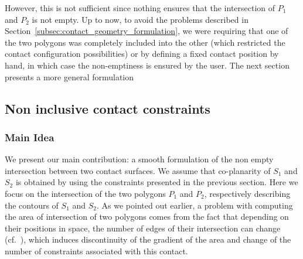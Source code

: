 However, this is not sufficient since nothing ensures that the intersection of $P_1$ and $P_2$ is not empty.
Up to now, to avoid the problems described in Section~\ref{subsec:contact_geometry_formulation}, we were requiring that one of the two polygons was completely included into the other (which restricted the contact configuration possibilities) or by defining a fixed contact position by hand, in which case the non-emptiness is ensured by the user.
The next section presents a more general formulation

\subsection{Non inclusive contact constraints}
\label{subsec:ellipse}
\subsubsection{Main Idea}
\label{subsubsec:idea}
We present our main contribution: a smooth formulation of the non empty intersection between two contact surfaces.
We assume that co-planarity of $S_1$ and $S_2$ is obtained by using the constraints presented in the previous section.
Here we focus on the intersection of the two polygons $P_1$ and $P_2$, respectively describing the contours of $S_1$ and $S_2$.
As we pointed out earlier, a problem with computing the area of intersection of two polygons comes from the fact that depending on their positions in space, the number of edges of their intersection can change (cf.~), which induces discontinuity of the gradient of the area and change of the number of constraints associated with this contact.

